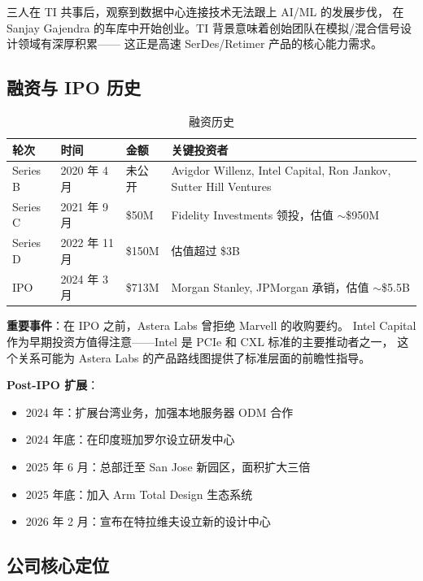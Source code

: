 三人在 TI 共事后，观察到数据中心连接技术无法跟上 AI/ML 的发展步伐，
在 Sanjay Gajendra 的车库中开始创业。TI 背景意味着创始团队在模拟/混合信号设计领域有深厚积累——
这正是高速 SerDes/Retimer 产品的核心能力需求。

\subsection{融资与 IPO 历史}

\begin{table}[htb]
    \centering
    \caption{融资历史}
    \label{tab:funding}
    \begin{tabular}{llll}
        \toprule
        \textbf{轮次} & \textbf{时间} & \textbf{金额} & \textbf{关键投资者} \\
        \midrule
        Series B & 2020 年 4 月 & 未公开 & Avigdor Willenz, Intel Capital, Ron Jankov, Sutter Hill Ventures \\
        Series C & 2021 年 9 月 & \$50M & Fidelity Investments 领投，估值 $\sim$\$950M \\
        Series D & 2022 年 11 月 & \$150M & 估值超过 \$3B \\
        IPO & 2024 年 3 月 & \$713M & Morgan Stanley, JPMorgan 承销，估值 $\sim$\$5.5B \\
        \bottomrule
    \end{tabular}
\end{table}

\textbf{重要事件}：在 IPO 之前，Astera Labs 曾拒绝 Marvell 的收购要约。
Intel Capital 作为早期投资方值得注意——Intel 是 PCIe 和 CXL 标准的主要推动者之一，
这个关系可能为 Astera Labs 的产品路线图提供了标准层面的前瞻性指导。

\textbf{Post-IPO 扩展}：
\begin{itemize}
    \item 2024 年：扩展台湾业务，加强本地服务器 ODM 合作
    \item 2024 年底：在印度班加罗尔设立研发中心
    \item 2025 年 6 月：总部迁至 San Jose 新园区，面积扩大三倍
    \item 2025 年底：加入 Arm Total Design 生态系统
    \item 2026 年 2 月：宣布在特拉维夫设立新的设计中心
\end{itemize}

\subsection{公司核心定位}

